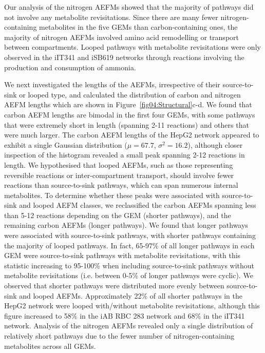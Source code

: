 \documentclass[12pt]{article}
\begin{document}
Our analysis of the nitrogen AEFMs showed that the majority of pathways
did not involve any metabolite revisitations. Since there are many fewer
nitrogen-containing metabolites in the five GEMs than carbon-containing
ones, the majority of nitrogen AEFMs involved amino acid remodelling or
transport between compartments. Looped pathways with metabolite
revisitations were only observed in the iIT341 and iSB619 networks through
reactions involving the production and consumption of ammonia. 

We next investigated the lengths of the AEFMs, irrespective of their
source-to-sink or looped type, and calculated the distribution of carbon
and nitrogen AEFM lengths which are shown in
Figure~\ref{fig04:Structural}c-d. We found that carbon AEFM lengths are
bimodal in the first four GEMs, with some pathways that were extremely
short in length (spanning 2-11 reactions) and others that were much
larger. The carbon AEFM lengths of the HepG2 network appeared to exhibit
a single Gaussian distribution ($\mu=67.7$, $\sigma^2=16.2$), although
closer inspection of the histogram revealed a small peak spanning 2-12
reactions in length. We hypothesised that looped AEFMs, such as those
representing reversible reactions or inter-compartment transport, should
involve fewer reactions than source-to-sink pathways, which can span
numerous internal metabolites. To determine whether these peaks were
associated with source-to-sink and looped AEFM classes, we reclassified
the carbon AEFMs spanning less than 5-12 reactions depending on the GEM
(shorter pathways), and the remaining carbon AEFMs (longer pathways). We
found that longer pathways were associated with source-to-sink pathways,
with shorter pathways containing the majority of looped pathways. In fact,
65-97\% of all longer pathways in each GEM were source-to-sink pathways
with metabolite revisitations, with this statistic increasing to 95-100\%
when including source-to-sink pathways without metabolite revisitations
(i.e. between 0-5\% of longer pathways were cyclic). We observed that
shorter pathways were distributed more evenly between source-to-sink and
looped AEFMs. Approximately 22\% of all shorter pathways in the HepG2
network were looped with/without metabolite revisitations, although this
figure increased to 58\% in the iAB RBC 283 network and 68\% in the iIT341
network. Analysis of the nitrogen AEFMs revealed only a single
distribution of relatively short pathways due to the fewer number of
nitrogen-containing metabolites across all GEMs.
\end{document}

